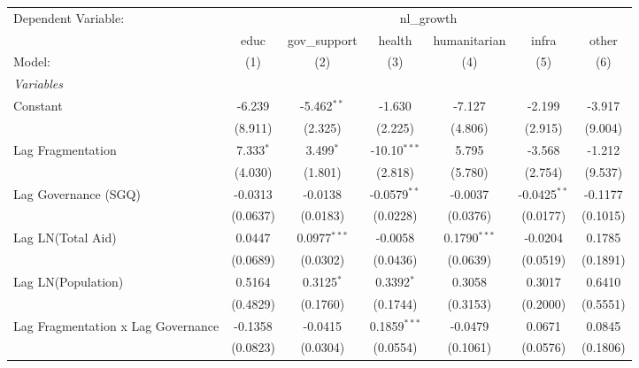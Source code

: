 \begingroup
\centering
\begin{tabular}{lcccccc}
   \tabularnewline \midrule \midrule
   Dependent Variable: & \multicolumn{6}{c}{nl\_growth}\\
                                      & educ        & gov\_support   & health         & humanitarian   & infra          & other \\   
   Model:                             & (1)         & (2)            & (3)            & (4)            & (5)            & (6)\\  
   \midrule
   \emph{Variables}\\
   Constant                           & -6.239      & -5.462$^{**}$  & -1.630         & -7.127         & -2.199         & -3.917\\   
                                      & (8.911)     & (2.325)        & (2.225)        & (4.806)        & (2.915)        & (9.004)\\   
   Lag Fragmentation                  & 7.333$^{*}$ & 3.499$^{*}$    & -10.10$^{***}$ & 5.795          & -3.568         & -1.212\\   
                                      & (4.030)     & (1.801)        & (2.818)        & (5.780)        & (2.754)        & (9.537)\\   
   Lag Governance (SGQ)               & -0.0313     & -0.0138        & -0.0579$^{**}$ & -0.0037        & -0.0425$^{**}$ & -0.1177\\   
                                      & (0.0637)    & (0.0183)       & (0.0228)       & (0.0376)       & (0.0177)       & (0.1015)\\   
   Lag LN(Total Aid)                  & 0.0447      & 0.0977$^{***}$ & -0.0058        & 0.1790$^{***}$ & -0.0204        & 0.1785\\   
                                      & (0.0689)    & (0.0302)       & (0.0436)       & (0.0639)       & (0.0519)       & (0.1891)\\   
   Lag LN(Population)                 & 0.5164      & 0.3125$^{*}$   & 0.3392$^{*}$   & 0.3058         & 0.3017         & 0.6410\\   
                                      & (0.4829)    & (0.1760)       & (0.1744)       & (0.3153)       & (0.2000)       & (0.5551)\\   
   Lag Fragmentation x Lag Governance & -0.1358     & -0.0415        & 0.1859$^{***}$ & -0.0479        & 0.0671         & 0.0845\\   
                                      & (0.0823)    & (0.0304)       & (0.0554)       & (0.1061)       & (0.0576)       & (0.1806)\\   

\end{tabular}
